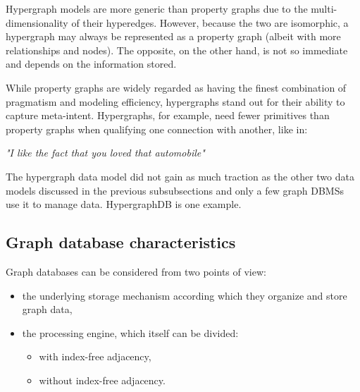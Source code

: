 Hypergraph models are more generic than property graphs due to the multi-dimensionality of their hyperedges.
However, because the two are isomorphic, a hypergraph may always be represented as a property graph (albeit with more relationships and nodes).
The opposite, on the other hand, is not so immediate and depends on the information stored.

While property graphs are widely regarded as having the finest combination of pragmatism and modeling efficiency, hypergraphs stand out for their ability to capture meta-intent.
Hypergraphs, for example, need fewer primitives than property graphs when qualifying one connection with another, like in:
\begin{quoting}[begintext={}, endtext={}]
	\centering\textit{"I like the fact that you loved that automobile"}
\end{quoting}

The hypergraph data model did not gain as much traction as the other two data models discussed in the previous subsubsections and only a few graph DBMSs use it to manage data.
HypergraphDB is one example.

\subsection{Graph database characteristics} \label{subsection:LiteratureReview/ReviewofGraphDatabaseSystems/Graphdatabasecharacteristics}
Graph databases can be considered from two points of view:
 \begin{itemize}[noitemsep]
	\item the underlying storage mechanism according which they organize and store graph data,
	\item the processing engine, which itself can be divided:
		 \begin{itemize}[noitemsep]
			\item with index-free adjacency,
			\item without index-free adjacency.
		\end{itemize}
\end{itemize}


